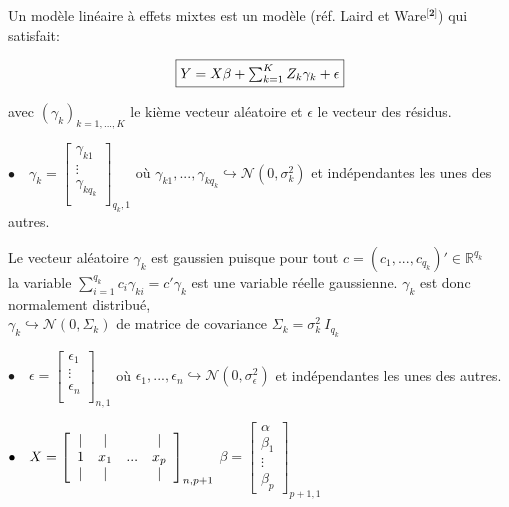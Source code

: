 \documentclass[12pt,fleqn]{book} %
\begin{document}
 \vspace{1em}
 
 Un modèle linéaire à effets mixtes est un modèle (réf. Laird et Ware$^{\textbf{[2]}}$) qui satisfait:

\begin{equation}
\fbox{$
Y=X\beta+\sum_{k=1}^{K} Z_k \gamma_k+\epsilon
$}
\end{equation}

\vspace{1em}

avec $(\gamma_k)_{k=1,...,K}$ le kième vecteur aléatoire et $\epsilon$ le vecteur des résidus.

  \vspace{1em} 
  
$\bullet\quad \gamma_k=\left[
  \begin{array}{ c }
     \gamma_{k1}  \\
     \vdots   \\
     \gamma_{k q_k}  \\ 
  \end{array} \right]_{q_k,1}$  \quad où \: $\gamma_{k1},..., \gamma_{k q_k}\hookrightarrow\mathcal{N}(0,\sigma_k^2)$ \: et indépendantes les unes des autres.

\vspace{1em}
  
  Le vecteur aléatoire $\gamma_k$ est gaussien puisque pour tout $c=(c_1, ... ,c_{q_k})'\in \mathbb{R}^{q_k}$ \\ la variable
  $\sum_{i=1}^{q_k} c_i\gamma_{k i}= c'\gamma_k $ est une variable réelle gaussienne. $\gamma_k$ est donc normalement distribué,\\ 
  $\gamma_k\hookrightarrow\mathcal{N}(0,\Sigma_k)$ de matrice de covariance $\Sigma_k=\sigma_k^2 \: I_{q_k}$ 
  
\vspace{1em}

$\bullet \quad \epsilon=\left[
  \begin{array}{ c }
     \epsilon_{1}  \\
     \vdots   \\
     \epsilon_{n}  \\ 
  \end{array} \right]_{n,1}$  \quad où \: $\epsilon_{1},..., \epsilon_{n}\hookrightarrow\mathcal{N}(0,\sigma_{\epsilon}^2)$ \: et indépendantes les unes des autres.

\vspace{1em}


$\bullet \quad X=\left[
  \begin{array}{ c c c c }
     |  & | & & | \\
     1 & x_1 & ... & x_p  \\
     |  & | & & |
  \end{array} \right]_{n,p+1}$ \quad $\beta=\left[
  \begin{array}{ c }
     \alpha  \\
     \beta_1   \\
      \vdots  \\
      \beta_p  
  \end{array} \right]_{p+1,1} $
  
\end{document}
